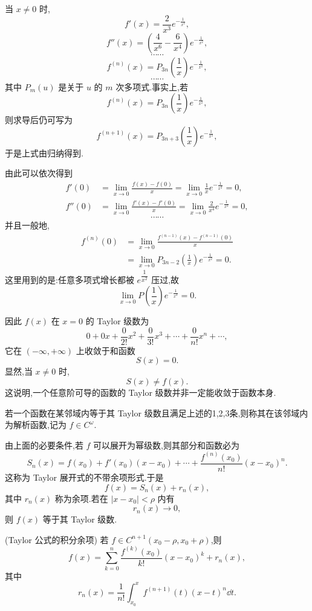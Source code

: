 \begin{solution}
	当 $x\neq0$ 时,
	\[
	f'(x)=\frac{2}{x^3}e^{-\frac{1}{x^2}},
	\]
	\[
	f''(x)=\left(\frac{4}{x^6}-\frac{6}{x^4}\right)e^{-\frac{1}{x^2}},
	\]
	\[
	\cdots\cdots
	\]
	\[
	f^{(n)}(x)=P_{3n}\left(\frac{1}{x}\right)e^{-\frac{1}{x^2}},
	\]
	\[
	\cdots\cdots
	\]
	其中 $P_m(u)$ 是关于 $u$ 的 $m$ 次多项式.事实上,若
	\[
	f^{(n)}(x)=P_{3n}\left(\frac{1}{x}\right)e^{-\frac{1}{x^2}},
	\]
	则求导后仍可写为
	\[
	f^{(n+1)}(x)=P_{3n+3}\left(\frac{1}{x}\right)e^{-\frac{1}{x^2}},
	\]
	于是上式由归纳得到.
	
	由此可以依次得到
	\[
	\begin{aligned}
		f'(0)
		&=\lim_{x\to0}\frac{f(x)-f(0)}{x}
		=\lim_{x\to0}\frac{1}{x}e^{-\frac{1}{x^2}}
		=0,\\[6pt]
		f''(0)
		&=\lim_{x\to0}\frac{f'(x)-f'(0)}{x}
		=\lim_{x\to0}\frac{2}{x^4}e^{-\frac{1}{x^2}}
		=0,
	\end{aligned}
	\]
	\[
	\cdots\cdots
	\]
	并且一般地,
	\[
	\begin{aligned}
		f^{(n)}(0)
		&=\lim_{x\to0}\frac{f^{(n-1)}(x)-f^{(n-1)}(0)}{x}\\
		&=\lim_{x\to0}P_{3n-2}\left(\frac{1}{x}\right)e^{-\frac{1}{x^2}}
		=0.
	\end{aligned}
	\]
	这里用到的是:任意多项式增长都被 $e^{\dfrac{1}{x^2}}$ 压过,故
	\[
	\lim_{x\to0}P\left(\frac{1}{x}\right)e^{-\frac{1}{x^2}}=0.
	\]
	
	因此 $f(x)$ 在 $x=0$ 的 Taylor 级数为
	\[
	0+0x+\frac{0}{2!}x^2+\frac{0}{3!}x^3+\cdots+\frac{0}{n!}x^n+\cdots,
	\]
	它在 $(-\infty,+\infty)$ 上收敛于和函数
	\[
	S(x)=0.
	\]
	显然,当 $x\neq0$ 时,
	\[
	S(x)\neq f(x).
	\]
	这说明,一个任意阶可导的函数的 Taylor 级数并非一定能收敛于函数本身.
\end{solution}

\begin{definition}
	若一个函数在某邻域内等于其 Taylor 级数且满足上述的1,2,3条,则称其在该邻域内为解析函数,记为 $f\in C^\omega$.
\end{definition}


由上面的必要条件,若 $f$ 可以展开为幂级数,则其部分和函数必为
\[
S_n(x)=f(x_0)+f'(x_0)(x-x_0)+\cdots+\frac{f^{(n)}(x_0)}{n!}(x-x_0)^n.
\]
这称为 Taylor 展开式的不带余项形式.于是
\[
f(x)=S_n(x)+r_n(x),
\]
其中 $r_n(x)$ 称为余项.若在 $\left|x-x_0\right|<\rho$ 内有
\[
r_n(x)\to0,
\]
则 $f(x)$ 等于其 Taylor 级数.
\begin{proposition}
	(Taylor 公式的积分余项)
	若 $f\in C^{n+1}(x_0-\rho,x_0+\rho)$,则
	\[
	f(x)=\sum_{k=0}^{n}\frac{f^{(k)}(x_0)}{k!}(x-x_0)^k+r_n(x),
	\]
	其中
	\[
	r_n(x)=\frac{1}{n!}\int_{x_0}^{x}f^{(n+1)}(t)(x-t)^n\dd t.
	\]
\end{proposition}

